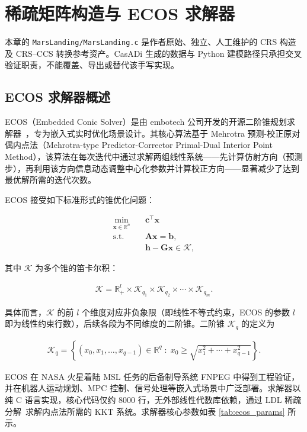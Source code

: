 \section{稀疏矩阵构造与 ECOS 求解器}

本章的 \texttt{MarsLanding/MarsLanding.c} 是作者原始、独立、人工维护的 CRS 构造及 CRS--CCS 转换参考资产。CasADi 生成的数据与 Python 建模路径只承担交叉验证职责，不能覆盖、导出或替代该手写实现。

\subsection{ECOS 求解器概述}

ECOS（Embedded Conic Solver）是由 embotech 公司开发的开源二阶锥规划求解器~\cite{domahidi2013theory}，专为嵌入式实时优化场景设计\cite{domahidi2013ecos}。其核心算法基于 Mehrotra 预测-校正原对偶内点法（Mehrotra-type Predictor-Corrector Primal-Dual Interior Point Method），该算法在每次迭代中通过求解两组线性系统——先计算仿射方向（预测步），再利用该方向信息动态调整中心化参数并计算校正方向——显著减少了达到最优解所需的迭代次数。

ECOS 接受如下标准形式的锥优化问题：

\begin{align}
\min_{\bm{x} \in \mathbb{R}^n} \quad & \bm{c}^{\top}\bm{x} \label{eq:ecos_obj} \\
\text{s.t.} \quad & \bm{A}\bm{x} = \bm{b}, \label{eq:ecos_eq} \\
& \bm{h} - \bm{G}\bm{x} \in \mathcal{K}, \label{eq:ecos_ineq}
\end{align}

其中 $\mathcal{K}$ 为多个锥的笛卡尔积：

\begin{align}
\mathcal{K} = \mathbb{R}_+^{l} \times \mathcal{K}_{q_1} \times \mathcal{K}_{q_2} \times \cdots \times \mathcal{K}_{q_m}.
\end{align}

具体而言，$\mathcal{K}$ 的前 $l$ 个维度对应非负象限（即线性不等式约束，ECOS 的参数 $l$ 即为线性约束行数），后续各段为不同维度的二阶锥。二阶锥 $\mathcal{K}_q$ 的定义为

\begin{align}
\mathcal{K}_q = \left\{ (x_0, x_1, \ldots, x_{q-1}) \in \mathbb{R}^q \;:\; x_0 \geq \sqrt{x_1^2 + \cdots + x_{q-1}^2} \right\}.
\end{align}

ECOS 在 NASA 火星着陆 MSL 任务的后备制导系统 FNPEG 中得到工程验证，并在机器人运动规划、MPC 控制、信号处理等嵌入式场景中广泛部署。求解器以纯 C 语言实现，核心代码仅约 8000 行，无外部线性代数库依赖，通过 LDL 稀疏分解~\cite{davis2006amd}求解内点法所需的 KKT 系统。求解器核心参数如表 \ref{tab:ecos_params} 所示。

